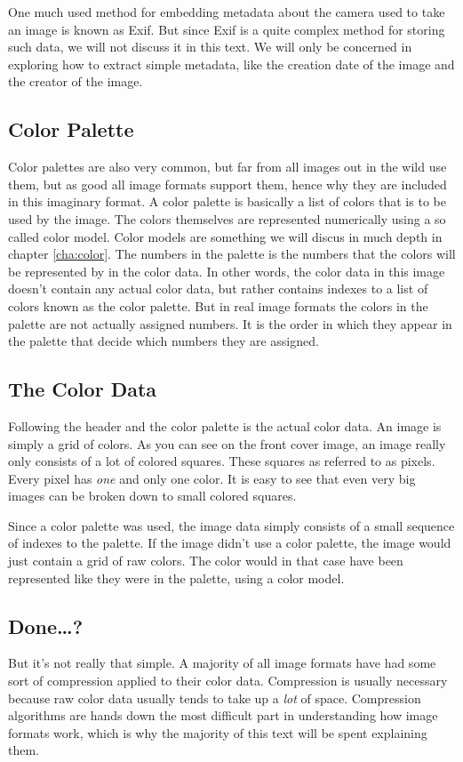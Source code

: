 One much used method for embedding metadata about the camera used to
take an image is known as Exif\cite{camera:_cipa_dc_trans_exchan}. But
since Exif is a quite complex method for storing such data, we will
not discuss it in this text. We will only be concerned in exploring
how to extract simple metadata, like the creation date of the image
and the creator of the image.

\subsection{Color Palette}

Color palettes are also very common, but far from all images out in
the wild use them, but as good all image formats support them, hence
why they are included in this imaginary format. A color palette is
basically a list of colors that is to be used by the image. The colors
themselves are represented numerically using a so called color
model. Color models are something we will discus in much depth in
chapter \ref{cha:color}. The numbers in the palette is the numbers
that the colors will be represented by in the color data. In other
words, the color data in this image doesn't contain any actual color
data, but rather contains indexes to a list of colors known as the
color palette. But in real image formats the colors in the palette are
not actually assigned numbers. It is the order in which they appear in
the palette that decide which numbers they are assigned.

\subsection{The Color Data}

Following the header and the color palette is the actual color data.
An image is simply a grid of colors. As you can see on the front cover
image, an image really only consists of a lot of colored
squares. These squares as referred to as
pixels\cite{murray1996encyclopedia}. Every pixel has \textit{one} and
only one color. It is easy to see that even very big images can be
broken down to small colored squares.

Since a color palette was used, the image data simply consists of a
small sequence of indexes to the palette. If the image didn't use a
color palette, the image would just contain a grid of raw colors. The
color would in that case have been represented like they were in the
palette, using a color model.

\subsection{Done\dots?}

But it's not really that simple. A majority of all image formats have
had some sort of compression applied to their color data. Compression
is usually necessary because raw color data usually tends to take up a
\textit{lot} of space. Compression algorithms are hands down the most
difficult part in understanding how image formats work, which is why
the majority of this text will be spent explaining them. 
